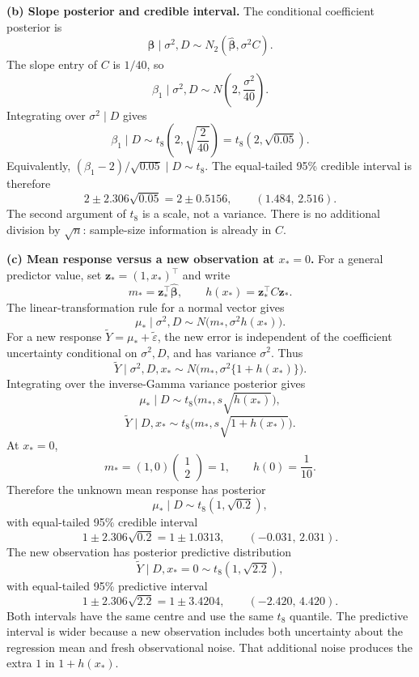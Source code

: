 \documentclass[11pt,a4paper]{article}
\begin{document}
\textbf{(b) Slope posterior and credible interval.}
The conditional coefficient posterior is
\[
\boldsymbol\beta\mid\sigma^2,D
\sim N_2(\widehat{\boldsymbol\beta},\sigma^2 C).
\]
The slope entry of $C$ is $1/40$, so
\[
\beta_1\mid\sigma^2,D\sim N\!\left(2,\frac{\sigma^2}{40}\right).
\]
Integrating over $\sigma^2\mid D$ gives
\[
\boxed{\beta_1\mid D\sim t_8\!\left(2,\sqrt{\frac2{40}}\right)
=t_8(2,\sqrt{0.05}).}
\]
Equivalently, $(\beta_1-2)/\sqrt{0.05}\mid D\sim t_8$. The equal-tailed
95\% credible interval is therefore
\[
2\pm2.306\sqrt{0.05}=2\pm0.5156,
\qquad\boxed{(1.484,\,2.516).}
\]
The second argument of $t_8$ is a scale, not a variance. There is no
additional division by $\sqrt n$: sample-size information is already in $C$.

\textbf{(c) Mean response versus a new observation at $x_*=0$.}
For a general predictor value, set $\mathbf z_*=(1,x_*)^\top$ and write
\[
m_*=\mathbf z_*^\top\widehat{\boldsymbol\beta},
\qquad h(x_*)=\mathbf z_*^\top C\mathbf z_*.
\]
The linear-transformation rule for a normal vector gives
\[
\mu_*\mid\sigma^2,D
\sim N\bigl(m_*,\sigma^2 h(x_*)\bigr).
\]
For a new response $\widetilde Y=\mu_*+\widetilde\varepsilon$, the new
error is independent of the coefficient uncertainty conditional on
$\sigma^2,D$, and has variance $\sigma^2$. Thus
\[
\widetilde Y\mid\sigma^2,D,x_*
\sim N\bigl(m_*,\sigma^2\{1+h(x_*)\}\bigr).
\]
Integrating over the inverse-Gamma variance posterior gives
\[
\mu_*\mid D\sim t_8\bigl(m_*,s\sqrt{h(x_*)}\bigr),
\]
\[
\widetilde Y\mid D,x_*\sim t_8\bigl(m_*,s\sqrt{1+h(x_*)}\bigr).
\]
At $x_*=0$,
\[
m_*=(1,0)\begin{pmatrix}1\\2\end{pmatrix}=1,
\qquad h(0)=\frac1{10}.
\]
Therefore the unknown mean response has posterior
\[
\boxed{\mu_*\mid D\sim t_8(1,\sqrt{0.2}),}
\]
with equal-tailed 95\% credible interval
\[
1\pm2.306\sqrt{0.2}=1\pm1.0313,
\qquad\boxed{(-0.031,\,2.031).}
\]
The new observation has posterior predictive distribution
\[
\boxed{\widetilde Y\mid D,x_*=0\sim t_8(1,\sqrt{2.2}),}
\]
with equal-tailed 95\% predictive interval
\[
1\pm2.306\sqrt{2.2}=1\pm3.4204,
\qquad\boxed{(-2.420,\,4.420).}
\]
Both intervals have the same centre and use the same $t_8$ quantile.
The predictive interval is wider because a new observation includes both
uncertainty about the regression mean and fresh observational noise. That
additional noise produces the extra $1$ in $1+h(x_*)$.
\end{document}

